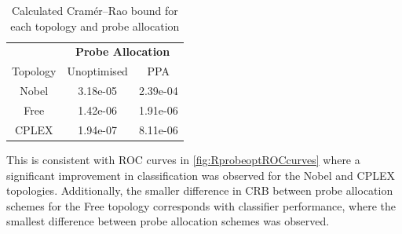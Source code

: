 \begin{table}[H]
 \centering
  \begin{tabular}{@{}ccc@{}}
   \toprule
    &\multicolumn{2}{c}{\textbf{Probe Allocation}}\\
    \cmidrule(rl){2-3}
    Topology & Unoptimised & PPA \\
    \midrule
    Nobel & 3.18e-05 & 2.39e-04\\
    Free & 1.42e-06 & 1.91e-06\\
    CPLEX & 1.94e-07 & 8.11e-06\\
   \bottomrule
  \end{tabular}
  \caption{Calculated Cramér–Rao bound for each topology and probe allocation}
  \label{tbl:crbs}
\end{table}
This is consistent with ROC curves in \cref{fig:RprobeoptROCcurves} where a significant improvement in classification was observed for the Nobel and CPLEX topologies. Additionally, the smaller difference in CRB between probe allocation schemes for the Free topology corresponds with classifier performance, where the smallest difference between probe allocation schemes was observed.\par


